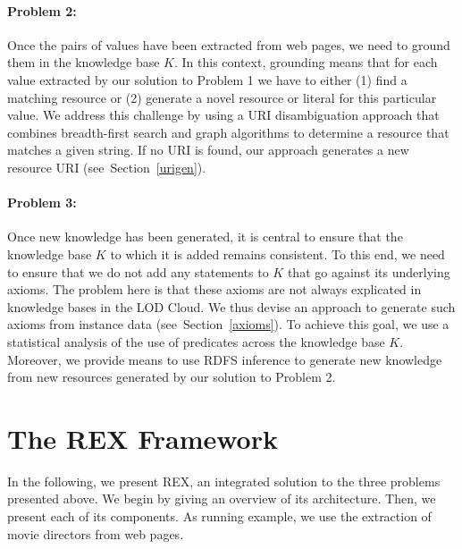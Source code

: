\paragraph{Problem 2:}
Once the  pairs of values have been extracted from web pages, we need to ground them in the knowledge base $K$. 
In this context, grounding means that for each value extracted by our solution to Problem 1 we have to either (1) find a matching resource or (2) generate a novel resource or literal for this particular value. 
We address this challenge by using a URI disambiguation approach that combines breadth-first search and graph algorithms to determine a resource that matches a given string. 
If no URI is found, our approach generates a new resource URI (see~Section~\ref{urigen}).

\paragraph{Problem 3:}
Once new knowledge has been generated, it is central to ensure that the knowledge base $K$ to which it is added remains consistent. 
To this end, we need to ensure that we do not add any statements to $K$ that go against its underlying axioms. 
The problem here is that these axioms are not always explicated in knowledge bases in the LOD Cloud. 
We thus devise an approach to generate such axioms from instance data (see~Section~\ref{axioms}). 
To achieve this goal, we use a statistical analysis of the use of predicates across the knowledge base $K$. 
Moreover, we provide means to use RDFS inference to generate new knowledge from new resources generated by our solution to Problem 2.


\section{The REX Framework}
\label{sec:rex}
In the following, we present REX, an integrated  solution to the three problems presented above.
We begin by giving an overview of its architecture.
Then, we present each of its components.
As running example, we use the extraction of movie directors from web pages.

